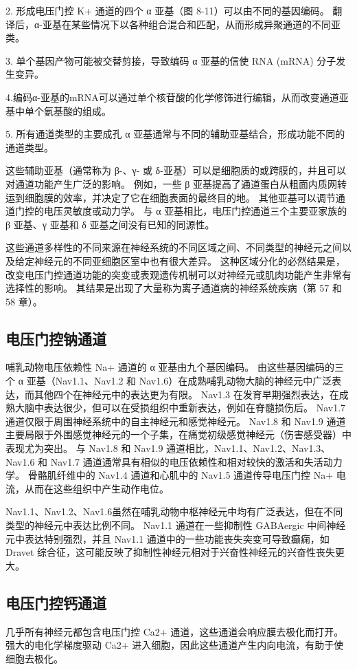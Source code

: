 2. 形成电压门控 K+ 通道的四个 α 亚基（图 8-11）可以由不同的基因编码。 
翻译后，α-亚基在某些情况下以各种组合混合和匹配，从而形成异聚通道的不同亚类。 


3. 单个基因产物可能被交替剪接，导致编码 α 亚基的信使 RNA (mRNA) 分子发生变异。 


4.编码α-亚基的mRNA可以通过单个核苷酸的化学修饰进行编辑，从而改变通道亚基中单个氨基酸的组成。 


5. 所有通道类型的主要成孔 α 亚基通常与不同的辅助亚基结合，形成功能不同的通道类型。


这些辅助亚基（通常称为 β-、γ- 或 δ-亚基）可以是细胞质的或跨膜的，并且可以对通道功能产生广泛的影响。 例如，一些 β 亚基提高了通道蛋白从粗面内质网转运到细胞膜的效率，并决定了它在细胞表面的最终目的地。 其他亚基可以调节通道门控的电压灵敏度或动力学。 与 α 亚基相比，电压门控通道三个主要亚家族的 β 亚基、γ 亚基和 δ 亚基之间没有已知的同源性。

这些通道多样性的不同来源在神经系统的不同区域之间、不同类型的神经元之间以及给定神经元的不同亚细胞区室中也有很大差异。 这种区域分化的必然结果是，改变电压门控通道功能的突变或表观遗传机制可以对神经元或肌肉功能产生非常有选择性的影响。 其结果是出现了大量称为离子通道病的神经系统疾病（第 57 和 58 章）。

\subsection{电压门控钠通道}
哺乳动物电压依赖性 Na+ 通道的 α 亚基由九个基因编码。 由这些基因编码的三个 α 亚基（Nav1.1、Nav1.2 和 Nav1.6）在成熟哺乳动物大脑的神经元中广泛表达，而其他四个在神经元中的表达更为有限。 Nav1.3 在发育早期强烈表达，在成熟大脑中表达很少，但可以在受损组织中重新表达，例如在脊髓损伤后。 Nav1.7 通道仅限于周围神经系统中的自主神经元和感觉神经元。 Nav1.8 和 Nav1.9 通道主要局限于外围感觉神经元的一个子集，在痛觉初级感觉神经元（伤害感受器）中表现尤为突出。 与 Nav1.8 和 Nav1.9 通道相比，Nav1.1、Nav1.2、Nav1.3、Nav1.6 和 Nav1.7 通道通常具有相似的电压依赖性和相对较快的激活和失活动力学。 骨骼肌纤维中的 Nav1.4 通道和心肌中的 Nav1.5 通道传导电压门控 Na+ 电流，从而在这些组织中产生动作电位。

Nav1.1、Nav1.2、Nav1.6虽然在哺乳动物中枢神经元中均有广泛表达，但在不同类型的神经元中表达比例不同。 Nav1.1 通道在一些抑制性 GABAergic 中间神经元中表达特别强烈，并且 Nav1.1 通道中的一些功能丧失突变可导致癫痫，如 Dravet 综合征，这可能反映了抑制性神经元相对于兴奋性神经元的兴奋性丧失更大。

\subsection{电压门控钙通道}
几乎所有神经元都包含电压门控 Ca2+ 通道，这些通道会响应膜去极化而打开。 强大的电化学梯度驱动 Ca2+ 进入细胞，因此这些通道产生内向电流，有助于使细胞去极化。

